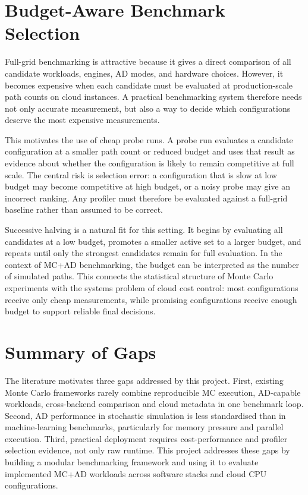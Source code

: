 \section{Budget-Aware Benchmark Selection}

Full-grid benchmarking is attractive because it gives a direct comparison of
all candidate workloads, engines, AD modes, and hardware choices. However, it
becomes expensive when each candidate must be evaluated at production-scale path
counts on cloud instances. A practical benchmarking system therefore needs not
only accurate measurement, but also a way to decide which configurations deserve
the most expensive measurements.

This motivates the use of cheap probe runs. A probe run evaluates a candidate
configuration at a smaller path count or reduced budget and uses that result as
evidence about whether the configuration is likely to remain competitive at full
scale. The central risk is selection error: a configuration that is slow at low
budget may become competitive at high budget, or a noisy probe may give an
incorrect ranking. Any profiler must therefore be evaluated against a full-grid
baseline rather than assumed to be correct.

Successive halving is a natural fit for this setting. It begins by evaluating
all candidates at a low budget, promotes a smaller active set to a larger budget,
and repeats until only the strongest candidates remain for full evaluation. In
the context of MC+AD benchmarking, the budget can be interpreted as the number
of simulated paths. This connects the statistical structure of Monte Carlo
experiments with the systems problem of cloud cost control: most configurations
receive only cheap measurements, while promising configurations receive enough
budget to support reliable final decisions.

\section{Summary of Gaps}

The literature motivates three gaps addressed by this project. First, existing
Monte Carlo frameworks rarely combine reproducible MC execution, AD-capable
workloads, cross-backend comparison and cloud metadata in one benchmark loop.
Second, AD performance in stochastic simulation is less standardised than in
machine-learning benchmarks, particularly for memory pressure and parallel
execution. Third, practical deployment requires cost-performance and profiler
selection evidence, not only raw runtime. This project addresses these gaps by
building a modular benchmarking framework and using it to evaluate implemented
MC+AD workloads across software stacks and cloud CPU configurations.
